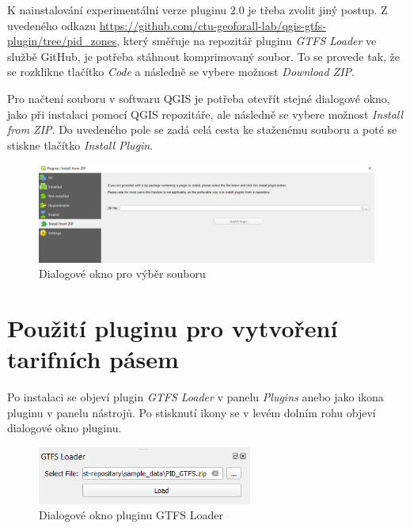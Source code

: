 K nainstalování experimentální verze pluginu 2.0 je třeba zvolit jiný postup.
Z uvedeného odkazu \href{https://github.com/ctu-geoforall-lab/qgis-gtfs-plugin/tree/pid\_zones}
{https://github.com/ctu-geoforall-lab/qgis-gtfs-plugin/tree/pid\_zo\-nes}, který směřuje na repozitář
pluginu \textit{GTFS Loader} ve službě GitHub, je potřeba stáhnout komprimovaný  soubor. 
To se provede tak, že se rozklikne tlačítko \textit{Code} a následně se vybere možnost
\textit{Download ZIP}.  

Pro načtení  souboru v softwaru QGIS je potřeba otevřít stejné dialogové okno,
jako při instalaci pomocí QGIS repozitáře, ale následně se vybere možnost \textit{Install from ZIP}. 
Do uvedeného pole se zadá celá cesta ke staženému  souboru a poté se stiskne tlačítko
\textit{Install Plugin}.

\begin{figure}[H] \centering
    \includegraphics[width=400pt]{./pictures-dodatek/zip.png}
    \caption[Dialogové okno pro výběr  souboru]{Dialogové okno pro výběr  souboru}
	\label{fig:zip}              
\end{figure} 

\section{Použití pluginu pro vytvoření tarifních pásem}

Po instalaci se objeví plugin \textit{GTFS Loader} v panelu \textit{Plugins} anebo jako ikona pluginu
v panelu nástrojů. Po stisknutí ikony se v levém dolním rohu objeví dialogové okno pluginu.

\begin{figure}[H] \centering
    \includegraphics[width=200pt]{./pictures-dodatek/plugin.png}
    \caption[Dialogové okno pluginu GTFS Loader]{Dialogové okno pluginu GTFS Loader}
	\label{fig:gtfs_loader}              
\end{figure} 

